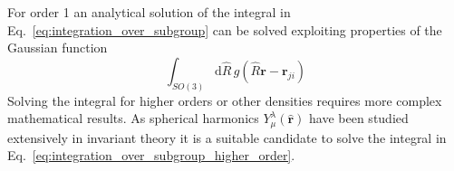 For order 1 an analytical solution of the integral in Eq.~\ref{eq:integration_over_subgroup} can be solved exploiting properties of the Gaussian function\cite{musil2019machine}
\begin{equation}
  \label{eq:order1_analytical_solution}
  \int_{SO(3)} \mathrm{d}\hat{R}\, g(\hat{R}\mathbf{r}-\mathbf{r}_{ji}) 
\end{equation}
Solving the integral for higher orders or other densities requires more complex mathematical results.%
As spherical harmonics $Y_\mu^\lambda(\hat{\mathbf{r}})$ have been studied extensively in invariant theory\cite{dowker2008spherical} it is a suitable candidate to solve the integral in Eq.~\ref{eq:integration_over_subgroup_higher_order}.
